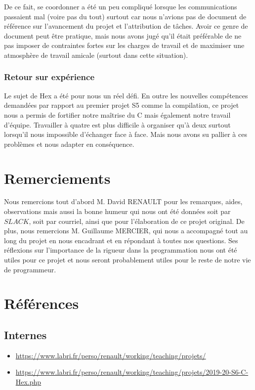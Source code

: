 \documentclass{article}
\begin{document}
De ce fait, se coordonner a été un peu compliqué lorsque les communications passaient mal (voire pas du tout) surtout car nous n'avions pas de document de référence sur l'avancement du projet et l'attribution de tâches. Avoir ce genre de document peut être pratique, mais nous avons jugé qu'il était préférable de ne pas imposer de contraintes fortes sur les charges de travail et de maximiser une atmosphère de travail amicale (surtout dans cette situation).

\subsubsection{Retour sur expérience}

Le sujet de Hex a été pour nous un réel défi. En outre les nouvelles compétences demandées par rapport au premier projet S5 comme la compilation, ce projet nous a permis de fortifier notre maîtrise du C mais également notre travail d'équipe. Travailler à quatre est plus difficile à organiser qu'à deux surtout lorsqu'il nous impossible d'échanger face à face. Mais nous avons su pallier à ces problèmes et nous adapter en conséquence.

\section{Remerciements}
Nous remercions tout d'abord M. David RENAULT pour les remarques, aides,  observations mais aussi la bonne humeur qui nous ont été données soit par $SLACK$, soit par courriel, ainsi que pour l'élaboration de ce projet original. De plus, nous remercions M. Guillaume MERCIER, qui nous a accompagné tout au long du projet en nous encadrant et en répondant à toutes nos questions. Ses réflexions sur l'importance de la rigueur dans la programmation nous ont été utiles pour ce projet et nous seront probablement utiles pour le reste de notre vie de programmeur. 

\newpage
\section{Références}
\subsection{Internes}
\begin{itemize}
    \item \url{https://www.labri.fr/perso/renault/working/teaching/projets/}
    \item \url{https://www.labri.fr/perso/renault/working/teaching/projets/2019-20-S6-C-Hex.php}
\end{itemize}
\end{document}
